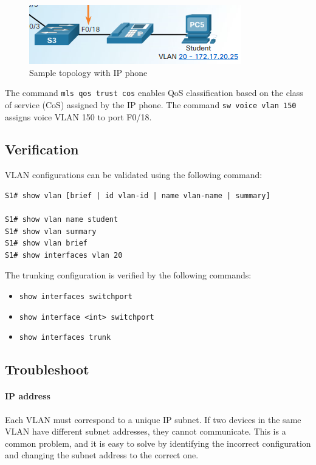 \begin{figure}[hbtp]
\caption{Sample topology with IP phone}\label{VoiceVLAN}
\centering
\includegraphics[scale=0.6]{pictures/VoiceVLAN.PNG}
\end{figure}

The command \verb|mls qos trust cos| enables QoS classification based on the class of service (CoS) assigned by the IP phone. The command \verb|sw voice vlan 150| assigns  voice VLAN 150 to port F0/18. 

\subsection{Verification}

VLAN configurations can be validated using the following command:

\begin{verbatim}
S1# show vlan [brief | id vlan-id | name vlan-name | summary]

S1# show vlan name student
S1# show vlan summary
S1# show vlan brief
S1# show interfaces vlan 20
\end{verbatim}

The trunking configuration is verified by the following commands:

\begin{itemize}
\item \verb|show interfaces switchport|
\item \verb|show interface <int> switchport|
\item \verb|show interfaces trunk| 
\end{itemize}

\subsection{Troubleshoot}

\paragraph{IP address} Each VLAN must correspond to a unique IP subnet. If two devices in the same VLAN have different subnet addresses, they cannot communicate. This is a common problem, and it is easy to solve by identifying the incorrect configuration and changing the subnet address to the correct one.

